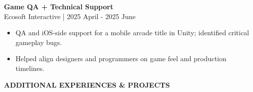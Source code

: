 \documentclass[11pt,a4paper]{article}
\newcommand{\jobentry}[2]{%
    \textbf{#1}\\
    {\small\color{lighttext}#2}\\[4pt]%
}
\begin{document}
\begin{minipage}[t]{14cm}
\begin{minipage}[t]{12.5cm}
\vspace{0.4cm}

\jobentry{Game QA + Technical Support}{Ecosoft Interactive | 2025 April - 2025 June}
\begin{itemize}[leftmargin=*, nosep, itemsep=2pt, topsep=2pt]
    \item QA and iOS-side support for a mobile arcade title in Unity; identified critical gameplay bugs.
    \item Helped align designers and programmers on game feel and production timelines.
\end{itemize}

\end{minipage}
\end{minipage}

\newpage


\vspace{1.2cm}

\begin{center}
{\large\bfseries\MakeUppercase{Additional Experiences \& Projects}}
\end{center}

\vspace{0.5cm}
\end{document}
